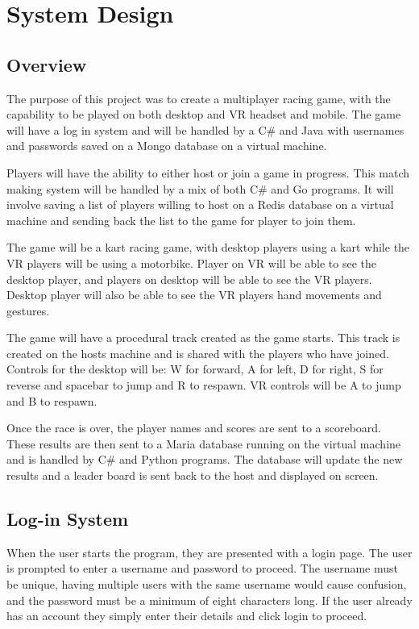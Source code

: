 
\chapter{System Design}
\section{Overview}
The purpose of this project was to create a multiplayer racing game, with the capability to be played on both desktop and VR headset and mobile. The game will have a log in system and will be handled by a C\# and Java with usernames and passwords saved on a Mongo database on a virtual machine.
\newline

Players will have the ability to either host or join a game in progress. This match making system will be handled by a mix of both C\# and Go programs. It will involve saving a list of players willing to host on a Redis database on a virtual machine and sending back the list to the game for player to join them.
\newline

The game will be a kart racing game, with desktop players using a kart while the VR players will be using a motorbike. Player on VR will be able to see the desktop player, and players on desktop will be able to see the VR players. Desktop player will also be able to see the VR players hand movements and gestures.
\newline

The game will have a procedural track created as the game starts. This track is created on the hosts machine and is shared with the players who have joined. Controls for the desktop will be:
W for forward, A for left, D for right, S for reverse and spacebar to jump and R to respawn.
VR controls will be A to jump and B to respawn.
\newline

Once the race is over, the player names and scores are sent to a scoreboard. These results are then sent to a Maria database running on the virtual machine and is handled by C\# and Python programs. The database will update the new results and a leader board is sent back to the host and displayed on screen.

\section{Log-in System}
When the user starts the program, they are presented with a login page. The user is prompted to enter a username and password to proceed. The username must be unique, having multiple users with the same username would cause confusion, and the password must be a minimum of eight characters long. If the user already has an account they simply enter their details and click login to proceed.
\newline 


